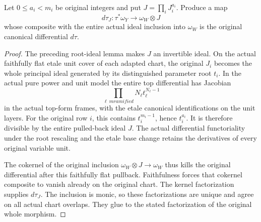 \begin{lemma}
\label{lem:kn-nadel-bounded-ramification-factor}
\notready
Let $0\leq a_i<m_i$ be original integers and put $J=\prod_i J_i^{a_i}$.
Produce a map
\[
 d\tau_J:\tau^*\omega_Y\longrightarrow\omega_W\otimes J
\]
whose composite with the entire actual ideal inclusion into $\omega_W$
is the original canonical differential $d\tau$.
\end{lemma}
\begin{proof}
The preceding root-ideal lemma makes $J$ an invertible ideal.  On the
actual faithfully flat etale unit cover of each adapted chart, the
original $J_i$ becomes the whole principal ideal generated by its
distinguished parameter root $t_i$.  In the actual pure power and unit
model the entire top differential has Jacobian
\[
 \prod_{\ell\ {
m ramified}} N_\ell t_\ell^{N_\ell-1}
\]
in the actual top-form frames, with the etale canonical identifications
on the unit layers.  For the original row $i$, this contains
$t_i^{m_i-1}$, hence $t_i^{a_i}$.  It is therefore divisible by the
entire pulled-back ideal $J$.  The actual differential functoriality
under the root rescaling and the etale base change retains the
derivatives of every original variable unit.

The cokernel of the original inclusion $\omega_W\otimes J\to\omega_W$
thus kills the original differential after this faithfully flat
pullback.  Faithfulness forces that cokernel composite to vanish
already on the original chart.  The kernel factorization supplies
$d\tau_J$.  The inclusion is monic, so these factorizations are unique
and agree on all actual chart overlaps.  They glue to the stated
factorization of the original whole morphism.
\end{proof}

